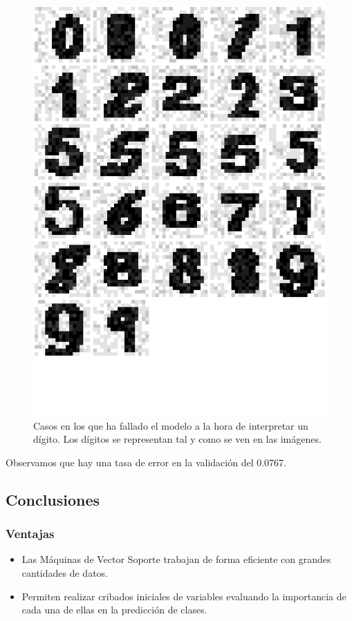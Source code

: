 \documentclass[12pt,spanish,a4paper]{article}
\numberwithin{equation}{section}
\begin{document}
\begin{figure}[h]

{\centering \includegraphics[width=0.8\linewidth]{graphics/svm/digitos_fallados_modelo_svm_linear2_paso2_b-1} 

}

\caption{Casos en los que ha fallado el modelo a la hora de interpretar un dígito. Los dígitos se representan tal y como se ven en las imágenes.}\label{fig:digitos_fallados_modelo_svm_linear2_paso2_b}
\end{figure}

Observamos que hay una tasa de error en la validación del 0.0767.

\clearpage

\subsection{Conclusiones}\label{conclusiones}

\subsubsection{Ventajas}\label{ventajas}

\begin{itemize}
\item
  Las Máquinas de Vector Soporte trabajan de forma eficiente con grandes
  cantidades de datos.
\item
  Permiten realizar cribados iniciales de variables evaluando la
  importancia de cada una de ellas en la predicción de clases.
\end{itemize}
\end{document}
